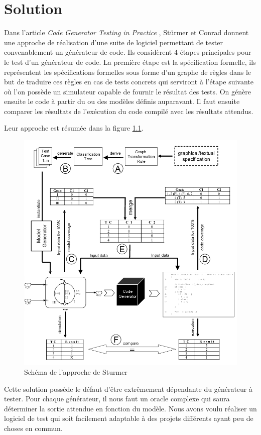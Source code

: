 \chapter{Solution}


Dans l'article \textit{Code Generator Testing in Practice} \cite{sturmer2004}, Stürmer et Conrad donnent une approche de réalisation
d'une suite de logiciel permettant de tester convenablement un générateur de code.
Ils considèrent 4 étapes principales pour le test d'un générateur de code. La première étape est la spécification formelle, ils représentent les spécifications
formelles sous forme d'un graphe de règles dans le but de traduire ces règles en cas de tests concrets qui serviront à l'étape suivante où l'on possède
un simulateur capable de fournir le résultat des tests. On génère ensuite le code à partir du ou des modèles définis auparavant. Il faut ensuite
comparer les résultats de l’exécution du code compilé avec les résultats attendus.

Leur approche est résumée dans la figure \ref{codegen}.


\begin{figure}[!ht]
	\centering
	\includegraphics[width=0.7\linewidth]{images/codegen.png}
	\caption{Schéma de l'approche de Sturmer}
	\label{codegen}
\end{figure}


Cette solution possède le défaut d'être extrêmement dépendante du générateur à tester. Pour chaque générateur, il nous faut un oracle complexe
qui saura déterminer la sortie attendue en fonction du modèle. Nous avons voulu réaliser un logiciel de test qui soit facilement adaptable à des
projets différents ayant peu de choses en commun.

